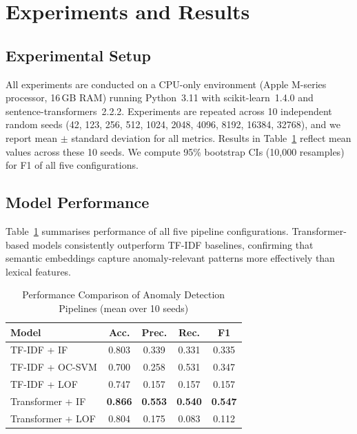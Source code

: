 \documentclass[conference]{IEEEtran}
\begin{document}
\section{Experiments and Results}
\label{sec:experiments}

\subsection{Experimental Setup}

All experiments are conducted on a CPU-only environment (Apple M-series
processor, 16\,GB RAM) running Python~3.11 with scikit-learn~1.4.0 and
sentence-transformers~2.2.2.  Experiments are repeated across 10 independent
random seeds (42, 123, 256, 512, 1024, 2048, 4096, 8192, 16384, 32768), and
we report mean $\pm$ standard deviation for all metrics.  Results in
Table~\ref{tab:results} reflect mean values across these 10 seeds.  We
compute 95\% bootstrap CIs (10{,}000 resamples) for F1 of all five
configurations.

\subsection{Model Performance}

Table~\ref{tab:results} summarises performance of all five pipeline
configurations.  Transformer-based models consistently outperform TF-IDF
baselines, confirming that semantic embeddings capture anomaly-relevant
patterns more effectively than lexical features.

\begin{table}[htbp]
\centering
\caption{Performance Comparison of Anomaly Detection Pipelines (mean over 10 seeds)}
\label{tab:results}
\renewcommand{\arraystretch}{1.2}
\begin{tabular}{@{}lcccc@{}}
\toprule
\textbf{Model} & \textbf{Acc.} & \textbf{Prec.} & \textbf{Rec.} & \textbf{F1} \\
\midrule
TF-IDF + IF        & 0.803 & 0.339 & 0.331 & 0.335 \\
TF-IDF + OC-SVM    & 0.700 & 0.258 & 0.531 & 0.347 \\
TF-IDF + LOF       & 0.747 & 0.157 & 0.157 & 0.157 \\
Transformer + IF   & \textbf{0.866} & \textbf{0.553} & \textbf{0.540} & \textbf{0.547} \\
Transformer + LOF  & 0.804 & 0.175 & 0.083 & 0.112 \\
\bottomrule
\end{tabular}
\end{table}
\end{document}
